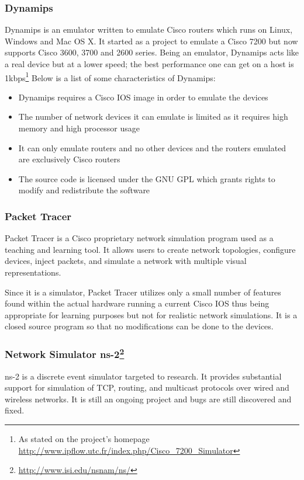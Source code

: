 \subsubsection{Dynamips}
Dynamips is an emulator written to emulate Cisco routers which runs on Linux, Windows and Mac OS X. It started as a project to emulate a Cisco 7200 but now supports  Cisco 3600, 3700 and 2600 series.
Being an emulator, Dynamips acts like a real device but at a lower speed; the best performance one can get on a host is 1kbps\footnote{As stated on the project's homepage \url{http://www.ipflow.utc.fr/index.php/Cisco_7200_Simulator}}
Below is a list of some characteristics of Dynamips:
\begin{itemize}
\item Dynamips requires a Cisco IOS image in order to emulate the devices 
\item The number of network devices it can emulate is limited as it requires high memory and high processor usage
\item It can only emulate routers and no other devices and the routers emulated are exclusively Cisco routers
\item The source code is licensed under the GNU GPL which grants rights to modify and redistribute the software
\end{itemize}

\subsubsection{Packet Tracer}
Packet Tracer is a Cisco proprietary network simulation program used as a teaching and learning tool. It allows users to create network topologies, configure devices, inject packets, and simulate a network with multiple visual representations.

Since it is a simulator, Packet Tracer utilizes only a small number of features found within the actual hardware running a current Cisco IOS thus being appropriate for learning purposes but not for realistic network simulations.
It is a closed source program so that no modifications can be done to the devices.
\subsubsection[Network Simulator ns-2]{Network Simulator ns-2\footnote{\url{http://www.isi.edu/nsnam/ns/}}}

ns-2 is a discrete event simulator targeted to research. It provides substantial support for simulation of TCP, routing, and multicast protocols over wired and wireless networks. It is still an ongoing project and bugs are still discovered and fixed.
\begin{comment}
Ns(network simulator) is a discrete event network simulator used for networking research.
\todo{Learn more about NS-2}
\end{comment}
